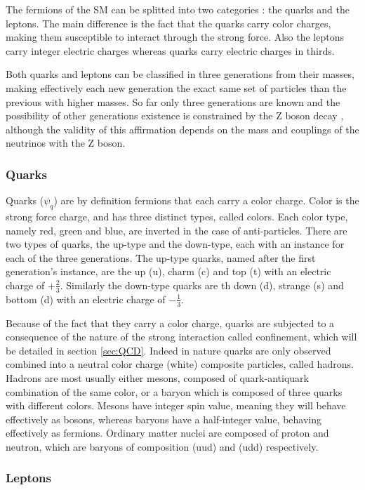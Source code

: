 The fermions of the SM can be splitted into two categories : the quarks and the leptons. The main difference is the fact that the quarks carry color charges, making them susceptible to interact through the strong force. Also the leptons carry integer electric charges whereas quarks carry electric charges in thirds.

Both quarks and leptons can be classified in three generations from their masses, making effectively each new generation the exact same set of particles than the previous with higher masses. So far only three generations are known and the possibility of other generations existence is constrained by the Z boson decay \citet{2006257}, although the validity of this affirmation depends on the mass and couplings of the neutrinos with the Z boson.

\subsubsection{Quarks}

Quarks ($\psi_q$) are by definition fermions that each carry a color charge. Color is the strong force charge, and has three distinct types, called colors. Each color type, namely red, green and blue, are inverted in the case of anti-particles. There are two types of quarks, the up-type and the down-type, each with an instance for each of the three generations. The up-type quarks, named after the first generation's instance, are the up (u), charm (c) and top (t) with an electric charge of $+\frac{2}{3}$. Similarly the down-type quarks are th down (d), strange (s) and bottom (d) with an electric charge of $-\frac{1}{3}$.

Because of the fact that they carry a color charge, quarks are subjected to a consequence of the nature of the strong interaction called confinement, which will be detailed in section \ref{sec:QCD}. Indeed in nature quarks are only observed combined into a neutral color charge (white) composite particles, called hadrons. Hadrons are most usually either mesons, composed of quark-antiquark combination of the same color, or a baryon which is composed of three quarks with different colors. Mesons have integer spin value, meaning they will behave effectively as bosons, whereas baryons have a half-integer value, behaving effectively as fermions. Ordinary matter nuclei are composed of proton and neutron, which are baryons of composition (uud) and (udd) respectively.

\subsubsection{Leptons}

